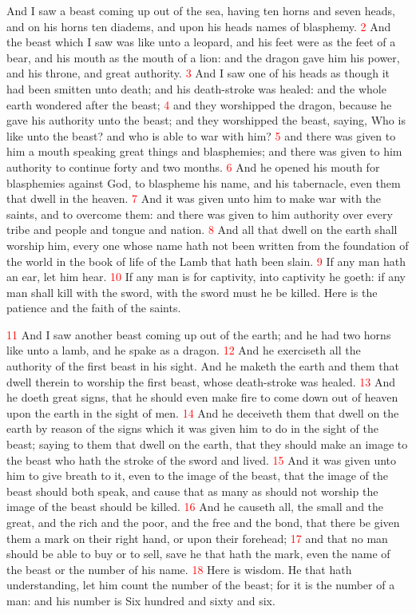 \documentclass[12pt,twoside]{memoir}
\newcommand{\vnum}[1]{\textcolor{red}{\normalsize{#1}}}
\begin{document}
And I saw a beast coming up out of the sea, having ten horns and seven heads, and on his horns ten diadems, and upon his heads names of blasphemy. 
\vnum{2} And the beast which I saw was like unto a leopard, and his feet were as the feet of a bear, and his mouth as the mouth of a lion: and the dragon gave him his power, and his throne, and great authority. 
\vnum{3} And I saw one of his heads as though it had been smitten unto death; and his death-stroke was healed: and the whole earth wondered after the beast; 
\vnum{4} and they worshipped the dragon, because he gave his authority unto the beast; and they worshipped the beast, saying, Who is like unto the beast? and who is able to war with him? 
\vnum{5} and there was given to him a mouth speaking great things and blasphemies; and there was given to him authority to continue forty and two months. 
\vnum{6} And he opened his mouth for blasphemies against God, to blaspheme his name, and his tabernacle, even them that dwell in the heaven. 
\vnum{7} And it was given unto him to make war with the saints, and to overcome them: and there was given to him authority over every tribe and people and tongue and nation. 
\vnum{8} And all that dwell on the earth shall worship him, every one whose name hath not been written from the foundation of the world in the book of life of the Lamb that hath been slain. 
\vnum{9} If any man hath an ear, let him hear. 
\vnum{10} If any man is for captivity, into captivity he goeth: if any man shall kill with the sword, with the sword must he be killed. Here is the patience and the faith of the saints.

\vnum{11} And I saw another beast coming up out of the earth; and he had two horns like unto a lamb, and he spake as a dragon. 
\vnum{12} And he exerciseth all the authority of the first beast in his sight. And he maketh the earth and them that dwell therein to worship the first beast, whose death-stroke was healed. 
\vnum{13} And he doeth great signs, that he should even make fire to come down out of heaven upon the earth in the sight of men. 
\vnum{14} And he deceiveth them that dwell on the earth by reason of the signs which it was given him to do in the sight of the beast; saying to them that dwell on the earth, that they should make an image to the beast who hath the stroke of the sword and lived. 
\vnum{15} And it was given unto him to give breath to it, even to the image of the beast, that the image of the beast should both speak, and cause that as many as should not worship the image of the beast should be killed. 
\vnum{16} And he causeth all, the small and the great, and the rich and the poor, and the free and the bond, that there be given them a mark on their right hand, or upon their forehead; 
\vnum{17} and that no man should be able to buy or to sell, save he that hath the mark, even the name of the beast or the number of his name. 
\vnum{18} Here is wisdom. He that hath understanding, let him count the number of the beast; for it is the number of a man: and his number is Six hundred and sixty and six.
\end{document}
